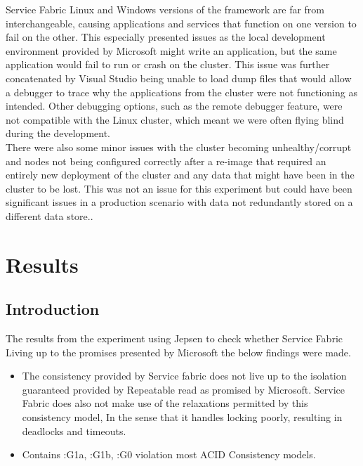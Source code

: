 \documentclass[a4paper,10pt,titlepage]{report}
\begin{document}
Service Fabric Linux and Windows versions of the framework are far from interchangeable, causing applications and services that function on one version to fail on the other. This especially presented issues as the local development environment provided by Microsoft might write an application, but the same application would fail to run or crash on the cluster. This issue was further concatenated by Visual Studio being unable to load dump files that would allow a debugger to trace why the applications from the cluster were not functioning as intended. Other debugging options, such as the remote debugger feature, were not compatible with the Linux cluster, which meant we were often flying blind during the development. \\ \vspace{2mm}
There were also some minor issues with the cluster becoming unhealthy/corrupt and nodes not being configured correctly after a re-image that required an entirely new deployment of the cluster and any data that might have been in the cluster to be lost. This was not an issue for this experiment but could have been significant issues in a production scenario with data not redundantly stored on a different data store..

\newpage
\section{Results}

\subsection{Introduction}

The results from the experiment using Jepsen to check whether Service Fabric Living up to the promises presented by Microsoft the below findings were made. 
\begin{itemize}
    \item The consistency provided by Service fabric does not live up to the isolation guaranteed provided by Repeatable read as promised by Microsoft. Service Fabric does also not make use of the relaxations permitted by this consistency model, In the sense that it handles locking poorly, resulting in deadlocks and timeouts.
    \item Contains :G1a, :G1b, :G0 violation most ACID Consistency models.
\end{itemize}
\end{document}
